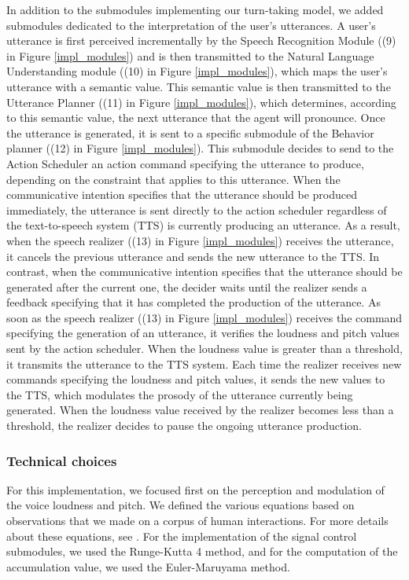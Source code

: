 \documentclass[twocolumn]{svjour3}
\begin{document}
In addition to the submodules implementing our turn-taking model, we added submodules dedicated to the interpretation of the user's utterances. 
A user's utterance is first perceived incrementally by the Speech Recognition Module ((9) in Figure \ref{impl_modules}) and is then  transmitted to the Natural Language Understanding module ((10) in Figure \ref{impl_modules}), which maps the user's utterance with a semantic value. This semantic value is then transmitted to the Utterance Planner ((11) in Figure \ref{impl_modules}), which determines, according to this semantic value, the next utterance that the agent will pronounce.  
Once the utterance is generated, it is sent to a specific submodule of the Behavior planner ((12) in Figure \ref{impl_modules}). This submodule decides to send to the Action Scheduler an action command specifying the utterance to produce, depending on the constraint that applies to this utterance. When the communicative intention specifies that the utterance should be produced immediately, the utterance is sent directly to the action scheduler regardless of the text-to-speech system (TTS) is currently producing an utterance. As a result, when the speech realizer ((13) in Figure \ref{impl_modules}) receives the utterance, it cancels the previous utterance and sends the new utterance to the TTS. In contrast, when the communicative intention specifies that the utterance should be generated after the current one, the decider waits until the realizer sends a feedback specifying that it has completed the production of the utterance.
As soon as the speech realizer ((13) in Figure \ref{impl_modules}) receives the command specifying the generation of an utterance, it verifies the loudness and pitch values sent by the action scheduler. When the loudness value is greater than a threshold, it transmits the utterance to the TTS system. Each time the realizer receives new commands specifying the loudness and pitch values, it sends the new values to the TTS, which modulates the prosody of the utterance currently being generated. When the loudness value received by the realizer becomes less than a threshold, the realizer decides to pause the ongoing utterance production.

\subsubsection{Technical choices}

For this implementation, we focused first on the perception and modulation of the voice loudness and pitch. We defined the various equations based on observations that we made on a corpus of human interactions. For more details about these equations, see \cite{jegou_continuous_2015}. For the implementation of the signal control submodules, we used the Runge-Kutta 4 method, and for the computation of the accumulation value, we used the Euler-Maruyama method. 
\end{document}
